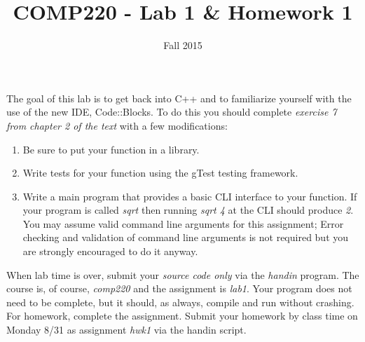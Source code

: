 \documentclass[10pt]{article}
\title{COMP220 - Lab 1 \& Homework 1}
\author{ }
\date{Fall 2015}
\begin{document}
\maketitle

The goal of this lab is to get back into C++ and to familiarize yourself with the use of the new IDE, Code::Blocks. To do this you should complete \textit{exercise 7 from chapter 2 of the text} with a few modifications:
\begin{enumerate}
\item Be sure to put your function in a library. 
\item Write tests for your function using the gTest testing framework.
\item Write a main program that provides a basic CLI interface to your function. If your program is called \textit{sqrt} then running \textit{sqrt 4} at the CLI should produce \textit{2}. You may assume valid command line arguments for this assignment;  Error checking and validation of command line arguments is not required but you are strongly encouraged to do it anyway. 
\end{enumerate}

When lab time is over, submit your \textit{source code only} via the \textit{handin} program. The course is, of course, \textit{comp220} and the assignment is \textit{lab1}. Your program does not need to be complete, but it should, as always, compile and run without crashing. For homework, complete the assignment. Submit your homework by class time on Monday 8/31 as assignment \textit{hwk1} via the handin script. 
\end{document}
